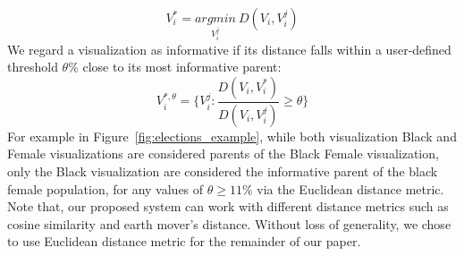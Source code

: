 \begin{equation}
    V_i^*=\underset{V_i^j}{argmin}\ D(V_i, V_i^j)
\end{equation}
We regard a visualization as informative if its distance falls within a user-defined threshold $\theta\%$ close to its most informative parent:
\begin{equation}
    V_i^{*, \theta} = \{V_i^j : \frac{D(V_i, V_i^*)}{D(V_i, V_i^j)} \geq \theta\}
\end{equation}
For example in Figure~\ref{fig:elections_example}, while both visualization Black and Female visualizations are considered parents of the Black Female visualization, only the Black visualization are considered the informative parent of the black female population, for any values of $\theta \geq 11\%$ via the Euclidean distance metric. Note that, our proposed system can work with different distance metrics such as cosine similarity and earth mover's distance. Without loss of generality, we chose to use Euclidean distance metric for the remainder of our paper.
